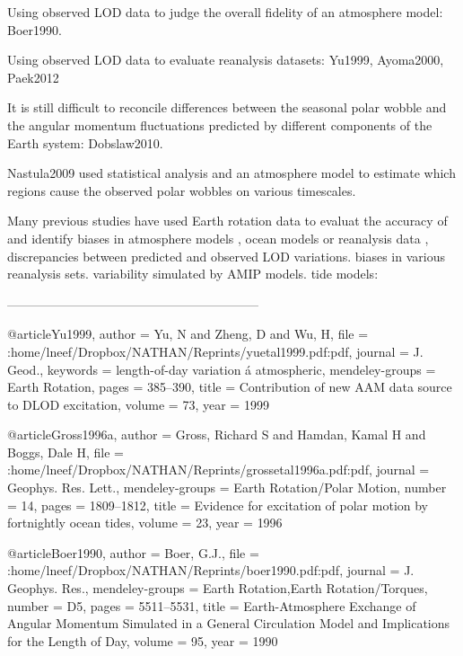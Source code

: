 Using observed LOD data to judge the overall fidelity of an atmosphere model: 
Boer1990.

Using observed LOD data to evaluate reanalysis datasets: Yu1999, Ayoma2000, 
Paek2012

It is still difficult to reconcile  differences between the seasonal 
polar wobble and the angular momentum fluctuations predicted by different 
components of the Earth system: Dobslaw2010.  

Nastula2009 used statistical analysis and an atmosphere model to estimate which 
regions cause the observed polar wobbles on various timescales.  


Many previous studies have used Earth rotation data to evaluat the accuracy of 
and identify biases in atmosphere models \citep{Boer1990, Rosen2000}, ocean 
models \citep{Gross1996a} or reanalysis data \citep{Yu1999, Ayoma2000, 
Paek2012},
discrepancies between predicted and observed LOD variations.
biases in various reanalysis sets.
variability simulated by AMIP models.
tide models: 


------------------------------------------------------------

@article{Yu1999,
author = {Yu, N and Zheng, D and Wu, H},
file = {:home/lneef/Dropbox/NATHAN/Reprints/yuetal1999.pdf:pdf},
journal = {J. Geod.},
keywords = {length-of-day variation \'{a} atmospheric},
mendeley-groups = {Earth Rotation},
pages = {385--390},
title = {{Contribution of new AAM data source to DLOD excitation}},
volume = {73},
year = {1999}
}

@article{Gross1996a,
author = {Gross, Richard S and Hamdan, Kamal H and Boggs, Dale H},
file = {:home/lneef/Dropbox/NATHAN/Reprints/grossetal1996a.pdf:pdf},
journal = {Geophys. Res. Lett.},
mendeley-groups = {Earth Rotation/Polar Motion},
number = {14},
pages = {1809--1812},
title = {{Evidence for excitation of polar motion by fortnightly ocean tides}},
volume = {23},
year = {1996}
}

@article{Boer1990,
author = {Boer, G.J.},
file = {:home/lneef/Dropbox/NATHAN/Reprints/boer1990.pdf:pdf},
journal = {J. Geophys. Res.},
mendeley-groups = {Earth Rotation,Earth Rotation/Torques},
number = {D5},
pages = {5511--5531},
title = {{Earth-Atmosphere Exchange of Angular Momentum Simulated in a General 
Circulation Model and Implications for the Length of Day}},
volume = {95},
year = {1990}
}

